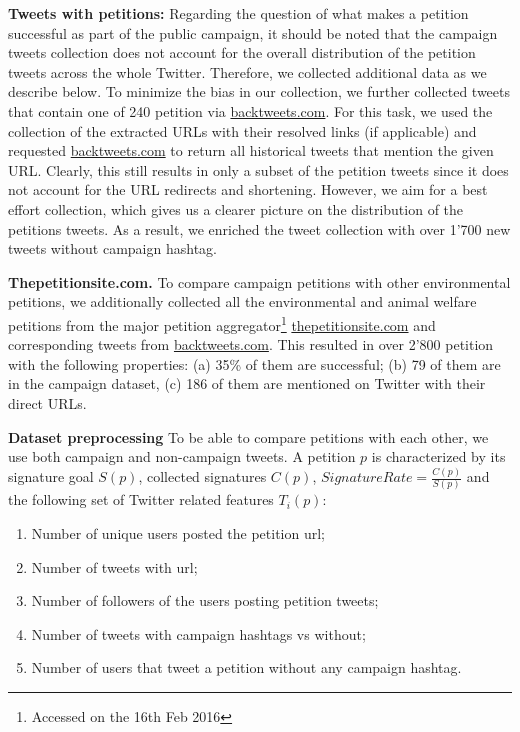 \textbf{Tweets with petitions:}
Regarding the question of what makes a petition successful as part of the public campaign,
it should be noted that the campaign tweets collection does not account for the overall distribution of the petition tweets across the whole Twitter. 
Therefore, we collected additional data as we describe below.
To minimize the bias in our collection, we further collected tweets that contain one of 240 petition via \url{backtweets.com}. For this task, we used the collection of the extracted URLs with their resolved links (if applicable) and requested \url{backtweets.com} to return all historical tweets that mention the given URL.
Clearly, this still results in only a subset of the petition tweets since it does not account for the URL redirects and shortening. However, we aim for a best effort collection, which gives us a clearer picture on the distribution of the petitions tweets.
As a result, we enriched the tweet collection with over 1'700 new tweets without campaign hashtag.

\textbf{Thepetitionsite.com.} To compare campaign petitions with other environmental petitions, we additionally collected all the environmental and animal welfare petitions from the major petition aggregator\footnote{Accessed on the 16th Feb 2016} \url{thepetitionsite.com} and corresponding tweets from \url{backtweets.com}. This resulted in over 2'800 petition with the following properties: (a) 35\% of them are successful; (b) 79 of them are in the campaign dataset, (c) 186 of them are mentioned on Twitter with their direct URLs.

\textbf{Dataset preprocessing}
To be able to compare petitions with each other, we use both campaign and non-campaign tweets.
A petition $p$ is characterized by its signature goal $S(p)$, collected signatures $C(p)$, $SignatureRate = \frac{C(p)}{S(p)}$ and the following set of Twitter related features $T_i(p)$:
\begin{enumerate}
	\setlength\itemsep{0em}
	\item Number of unique users posted the petition url;
	\item Number of tweets with url;
	\item Number of followers of the users posting petition tweets;
	\item Number of tweets with campaign hashtags vs without;
	\item Number of users that tweet a petition without any campaign hashtag.
\end{enumerate}